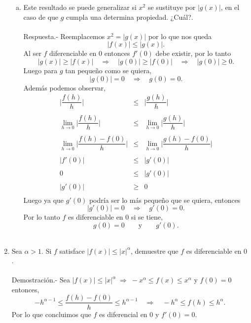 \begin{enumerate}[\bfseries 1]
\begin{enumerate}[(a)]
	    \item Este resultado se puede generalizar si $x^2$ se sustituye por $|g(x)|$, en el caso de que $g$ cumpla una determina propiedad. ¿Cuál?.\\\\
		Respuesta.-\; Reemplacemos $x^2=|g(x)|$ por lo que nos queda
		$$|f(x)|\leq |g(x)|.$$
		Al ser $f$ diferenciable en $0$ entonces $f'(0)$ debe existir, por lo tanto
		$$|g(x)|\geq |f(x)|\quad \Rightarrow \quad |g(0)|\geq |f(0)|\quad \Rightarrow \quad |g(0)|\geq 0.$$
		Luego para $g$ tan pequeño como se quiera,
		$$|g(0)|=0\quad \Rightarrow \quad g(0)=0.$$
		Además podemos observar,
		$$\begin{array}{rcl}
		    \bigg|\dfrac{f(h)}{h}\bigg|&\leq&\bigg|\dfrac{g(h)}{h}\bigg|\\\\
		    \lim\limits_{h\to 0}\bigg|\dfrac{f(h)}{h}\bigg|&\leq&\lim\limits_{h\to 0}\bigg|\dfrac{g(h)}{h}\bigg|\\\\
		    \lim\limits_{h\to 0} \bigg|\dfrac{f(h)-f(0)}{h}\bigg| & \leq &\lim\limits_{h\to 0} \bigg|\dfrac{g(h)-f(0)}{h}\bigg|\\\\
					       |f'(0)|&\leq&|g'(0)|\\\\
					       0&\leq&|g'(0)|\\\\
					       |g'(0)|&\geq&0\\
		\end{array}$$	
		Luego ya que $g'(0)$ podría ser lo más pequeño que se quiera, entonces
		$$|g'(0)|=0\quad \Rightarrow \quad g'(0)=0.$$
		Por lo tanto $f$ es diferenciable en $0$ si se tiene,
		$$g(0)=0\qquad \mbox{y} \qquad g'(0).$$\\

	\end{enumerate}

    \item Sea $\alpha>1.$ Si $f$ satisface $|f(x)|\leq |x|^{\alpha}$, demuestre que $f$ es diferenciable en $0$.\\\\
	Demostración.-\; Sea $|f(x)|\leq |x|^\alpha\;\Rightarrow \; -x^\alpha\leq f(x)\leq x^\alpha$ y $f(0)=0$ entonces,
	$$-h^{\alpha-1}\leq \dfrac{f(h)-f(0)}{h}\leq h^{\alpha-1}\quad \Rightarrow \quad -h^\alpha \leq f(h)\leq h^\alpha.$$
	Por lo que concluimos que $f$ es diferencial en $0$ y $f'(0)=0.$\\\\



\end{enumerate}
